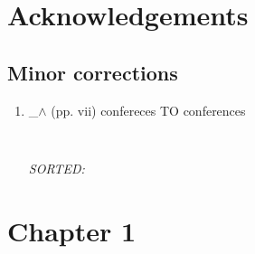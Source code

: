 \documentclass[12pt]{article}
\begin{document}


\section{Acknowledgements}

\subsection{Minor corrections}
\begin{enumerate}
\item   \_$\wedge$  
	(pp. vii) confereces TO conferences
	\begin{verbatim}
	
	\end{verbatim}
	\textit{
	SORTED:  
	}
	\\
	
\end{enumerate}





\section{Chapter 1}
\end{document}
